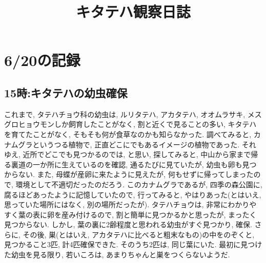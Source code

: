 \documentclass{jsarticle}
\title{キタテハ観察日誌}
\begin{document}
\maketitle

\section{6/20の記録}
\subsection{15時:キタテハの幼虫確保}
これまで, タテハチョウ科の幼虫は, ルリタテハ, アカタテハ, オオムラサキ, メスグロヒョウモンしか飼育したことがなく, 
割と近くで見ることの多い, キタテハを育てたことがなく, そもそも何が食草なのかも知らなかった. 
調べてみると, カナムグラというつる植物で, 正直どこにでもあるイメージの植物であった. 
それゆえ, 近所でどこでも見つかるのでは, と思い, 探してみると, 中山から家まで帰る裏道の一か所に生えているのを確認, 
通るたびに見ていたが, 幼虫も卵も見つからない. また, 母蝶が産卵に来たように見えたが, 何もせずに帰ってしまったので, 環境として不適切だったのだろう. 
このカナムグラであるが, 四季の森公園に, 腐るほどあったように記憶していたので, 行ってみると, やはりあった(とはいえ, 思っていた場所にはなく, 別の場所だったが).
タテハチョウは, 非常にわかりやすく葉の表に卵を産み付けるので, 割と簡単に見つかるかと思ったが, まったく見つからない. 
しかし, 葉の裏に2齢程度と思われる幼虫がすぐ見つかり, 確保. さらに, その後, 巣(とはいえ, アカタテハに比べると粗末なもの)の中をのぞくと, 見つかること3匹, 計4匹確保できた. 
そのうち2匹は, 同じ葉にいた. 
最初に見つけた幼虫を見る限り, 若いころは, あまりちゃんと巣をつくらないようだ. 
\end{document}
